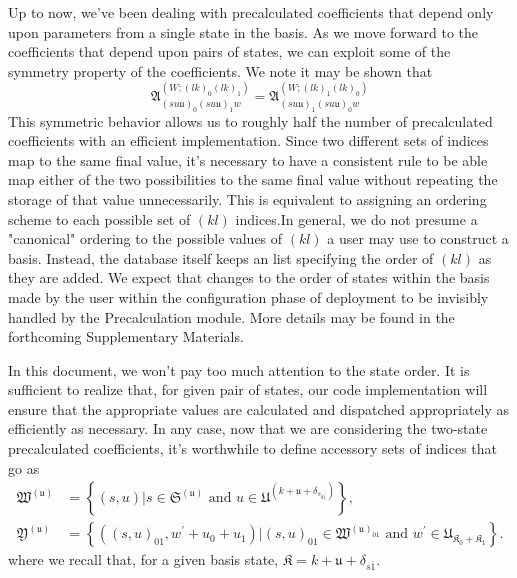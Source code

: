 Up to now, we've been dealing with precalculated coefficients that depend only
upon parameters from a single state in the basis. As we move forward to the
coefficients that depend upon pairs of states, we can exploit some of the
symmetry property of the coefficients. We note it may be shown that
\begin{equation}
\mathfrak{A}
_{\left(su\mathfrak{u}\right)_{0}\left(su\mathfrak{u}\right)_{1}w}
^{\left(W;\left(lk\right)_{0}\left(lk\right)_{1}\right)}
    =
        \mathfrak{A}
        _{\left(su\mathfrak{u}\right)_{1}\left(su\mathfrak{u}\right)_{0}w}
        ^{\left(W;\left(lk\right)_{1}\left(lk\right)_{0}\right)}
\end{equation}
This symmetric behavior allows us to roughly half the number of precalculated
coefficients with an efficient implementation. Since two different sets of
indices map to the same final value, it's necessary to have a consistent rule to
be able map either of the two possibilities to the same final value without
repeating the storage of that value unnecessarily. This is equivalent to
assigning an ordering scheme to each possible set of $\left(kl\right)$
indices.In general, we do not presume a "canonical" ordering to the possible
values of $\left(kl\right)$ a user may use to construct a basis. Instead, the
database itself keeps an list specifying the order of $\left(kl\right)$ as they
are added. We expect that changes to the order of states within the basis made
by the user within the configuration phase of deployment to be invisibly handled
by the Precalculation module. More details may be found in the forthcoming
Supplementary Materials.

In this document, we won't pay too much attention to the state order. It is
sufficient to realize that, for given pair of states, our code implementation
will ensure that the appropriate values are calculated and dispatched
appropriately as efficiently as necessary. In any case, now that we are
considering the two-state precalculated coefficients, it's worthwhile to define
accessory sets of indices that go as
\begin{align}
\bm{\mathfrak{W}}^{\left(\mathfrak{u}\right)}
    &=
        \left\{
            \left(s,u\right)
                |
            s \in \mathfrak{S}^{\left(\mathfrak{u}\right)}
                \text{ and }
            u
                \in 
            \mathfrak{U}^{\left(k+\mathfrak{u}+\delta_{s_{0\bar1}}\right)}
        \right\}
,\\
\bm{\mathfrak{Y}}^{\left(\mathfrak{u}\right)}
    &=
        \left\{
            \left(\left(s,u\right)_{01}, w^{\prime}+u_{0}+u_{1}\right)
                |
            \left(s,u\right)_{01}
                \in
            \bm{\mathfrak{W}}^{\left(\mathfrak{u}\right)_{01}}
                \text{ and }
            w^{\prime}
                \in
            \bm{\mathfrak{U}}
            _{
                \mathfrak{K}_{0}
                    +
                \mathfrak{K}_{1}
            }
        \right\}
.
\end{align}
where we recall that, for a given basis state, $\mathfrak{K} = k + \mathfrak{u}
+ \delta_{s\bar{1}}$.

